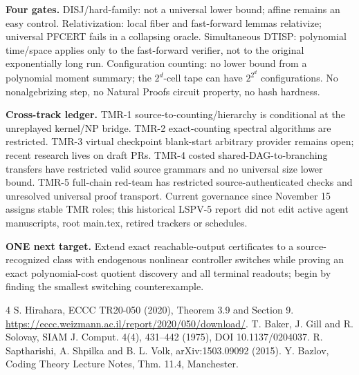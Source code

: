 \documentclass[11pt]{article}
\begin{document}
\noindent\textbf{Four gates.} DISJ/hard-family: not a universal lower bound; affine remains an easy control. Relativization: local fiber and fast-forward lemmas relativize; universal PFCERT fails in a collapsing oracle. Simultaneous DTISP: polynomial time/space applies only to the fast-forward verifier, not to the original exponentially long run. Configuration counting: no lower bound from a polynomial moment summary; the $2^d$-cell tape can have $2^{2^d}$ configurations. No nonalgebrizing step, no Natural Proofs circuit property, no hash hardness.

\noindent\textbf{Cross-track ledger.} TMR-1 source-to-counting/hierarchy is conditional at the unreplayed kernel/NP bridge. TMR-2 exact-counting spectral algorithms are restricted. TMR-3 virtual checkpoint blank-start arbitrary provider remains open; recent research lives on draft PRs. TMR-4 costed shared-DAG-to-branching transfers have restricted valid source grammars and no universal size lower bound. TMR-5 full-chain red-team has restricted source-authenticated checks and unresolved universal proof transport. Current governance since November 15 assigns stable TMR roles; this historical LSPV-5 report did not edit active agent manuscripts, root main.tex, retired trackers or schedules.

\noindent\textbf{ONE next target.} Extend exact reachable-output certificates to a source-recognized class with endogenous nonlinear controller switches while proving an exact polynomial-cost quotient discovery and all terminal readouts; begin by finding the smallest switching counterexample.

\begin{thebibliography}{4}
 S. Hirahara, ECCC TR20-050 (2020), Theorem 3.9 and Section 9. \url{https://eccc.weizmann.ac.il/report/2020/050/download/}.
 T. Baker, J. Gill and R. Solovay, SIAM J. Comput. 4(4), 431--442 (1975), DOI 10.1137/0204037.
 R. Saptharishi, A. Shpilka and B. L. Volk, arXiv:1503.09092 (2015).
 Y. Bazlov, Coding Theory Lecture Notes, Thm. 11.4, Manchester.
\end{thebibliography}
\end{document}
